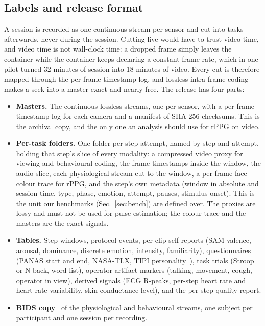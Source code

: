 \documentclass[10pt,twocolumn,letterpaper]{article}
\begin{document}
\subsection{Labels and release format}\label{sec:release}
A session is recorded as one continuous stream per sensor and cut into tasks afterwards, never during the session.
Cutting live would have to trust video time, and video time is not wall-clock time: a dropped frame simply leaves
the container while the container keeps declaring a constant frame rate, which in one pilot turned 32 minutes of
session into 18 minutes of video. Every cut is therefore mapped through the per-frame timestamp log, and lossless
intra-frame coding makes a seek into a master exact and nearly free. The release has four parts:

\begin{itemize}\itemsep1pt
  \item \textbf{Masters.} The continuous lossless streams, one per sensor, with a per-frame timestamp log for each
    camera and a manifest of SHA-256 checksums. This is the archival copy, and the only one an analysis should use
    for rPPG on video.
  \item \textbf{Per-task folders.} One folder per step attempt, named by step and attempt, holding that step's slice
    of every modality: a compressed video proxy for viewing and behavioural coding, the frame timestamps inside the
    window, the audio slice, each physiological stream cut to the window, a per-frame face colour trace for rPPG,
    and the step's own metadata (window in absolute and session time, type, phase, emotion, attempt, pauses,
    stimulus onset). This is the unit our benchmarks (Sec.~\ref{sec:bench}) are defined over. The proxies are lossy
    and must not be used for pulse estimation; the colour trace and the masters are the exact signals.
  \item \textbf{Tables.} Step windows, protocol events, per-clip self-reports (SAM valence, arousal, dominance,
    discrete emotion, intensity, familiarity), questionnaires (PANAS start and end, NASA-TLX, TIPI
    personality~\cite{gosling2003}), task trials (Stroop or N-back, word list), operator artifact markers (talking,
    movement, cough, operator in view), derived signals (ECG R-peaks, per-step heart rate and heart-rate
    variability, skin conductance level), and the per-step quality report.
  \item \textbf{BIDS copy}~\cite{gorgolewski2016bids} of the physiological and behavioural streams, one subject per
    participant and one session per recording.
\end{itemize}
\end{document}
